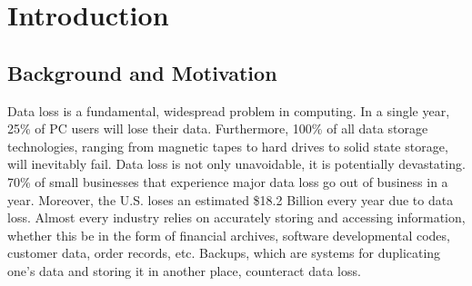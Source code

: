 \chapter{Introduction}

\section{Background and Motivation}
Data loss is a fundamental, widespread problem in computing. In a single year, 25\% of PC users will lose their data. Furthermore, 100\% of all data storage technologies, ranging from magnetic tapes to hard drives to solid state storage, will inevitably fail. \cite{imagineiti}  Data loss is not only unavoidable, it is potentially devastating. 70\% of small businesses that experience major data loss go out of business in a year. \cite{imagineiti} Moreover, the U.S. loses an estimated \$18.2 Billion every year due to data loss. \cite{pepperdine} Almost every industry relies on accurately storing and accessing information, whether this be in the form of financial archives, software developmental codes, customer data, order records, etc. Backups, which are systems for duplicating one’s data and storing it in another place, counteract data loss.

